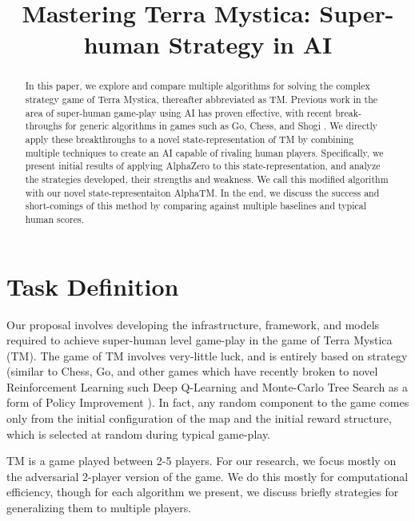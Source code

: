 \documentclass[10pt,twocolumn,letterpaper]{article}
\begin{document}
\title{Mastering Terra Mystica: Super-human Strategy in AI}


\maketitle
\thispagestyle{empty}

\begin{abstract}
In this paper, we explore and compare multiple algorithms for solving the complex strategy game of Terra Mystica, thereafter abbreviated as TM. Previous work in the area of super-human game-play using AI has proven effective, with recent break-throughs for generic algorithms in games such as Go, Chess, and Shogi \cite{AlphaZero}. We directly apply these breakthroughs to a novel state-representation of TM by combining multiple techniques to create an AI capable of rivaling human players. Specifically, we present initial results of applying AlphaZero to this state-representation, and analyze the strategies developed, their strengths and weakness. We call this modified algorithm with our novel state-representaiton AlphaTM. In the end, we discuss the success and short-comings of this method by comparing against multiple baselines and typical human scores.
\end{abstract}

\section{Task Definition}
\label{section:task_definition}
Our proposal involves developing the infrastructure, framework, and models required to achieve super-human level game-play in the game of Terra Mystica (TM).  The game of TM involves very-little luck, and is entirely based on strategy (similar to Chess, Go, and other games which have recently broken to novel Reinforcement Learning such Deep Q-Learning and Monte-Carlo Tree Search as a form of Policy Improvement \cite{AlphaGo} \cite{AlphaGoZero}). In fact, any random component to the game comes only from the initial configuration of the map and the initial reward structure, which is selected at random during typical game-play.

TM is a game played between 2-5 players. For our research, we focus mostly on the adversarial 2-player version of the game. We do this mostly for computational efficiency, though for each algorithm we present, we discuss briefly strategies for generalizing them to multiple players.
\end{document}

